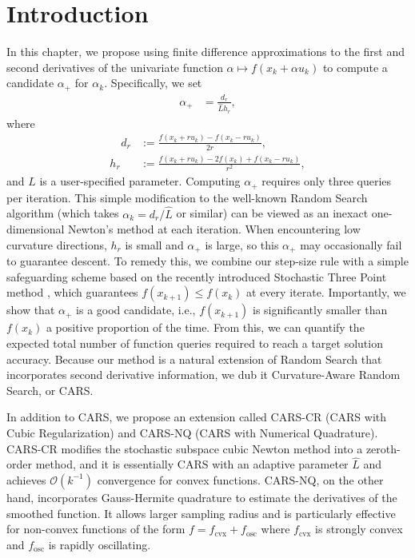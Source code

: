 \section{Introduction}
In this chapter, we propose using finite difference approximations to the first and second derivatives of the univariate function $\alpha \mapsto f(x_k +\alpha u_k)$ to compute a candidate $\alpha_{+}$ for $\alpha_k$. Specifically, we set
\begin{align*}
    \alpha_{+} & = \frac{d_r}{\hat{L}h_r},
\end{align*}
where
\begin{align}
    \quad d_{r} & := \frac{f(x_k+r u_k) - f(x_k-r u_k)}{2r},            \label{eq: FD def d_r}\\
    h_{r}       & := \frac{f(x_k+r u_k) - 2f(x_k) + f(x_k-r u_k)}{r^2}, \label{eq: FD def h_r}
\end{align}
and $\hat{L}$ is a user-specified parameter. Computing $\alpha_+$ requires only three queries per iteration. This simple modification to the well-known Random Search algorithm \cite{ghadimi2013stochastic,nesterov2017random} (which takes $\alpha_k = d_r/\hat{L}$ or similar) can be viewed as an inexact one-dimensional Newton's method at each iteration. When encountering low curvature directions, $h_r$ is small and $\alpha_{+}$ is large, so this $\alpha_{+}$ may occasionally fail to guarantee descent. To remedy this, we combine our step-size rule with a simple safeguarding scheme based on the recently introduced Stochastic Three Point method \cite{bergou2020stochastic}, which guarantees $f(x_{k+1}) \leq f(x_k)$ at every iterate. Importantly, we show that $\alpha_{+}$ is a good candidate, i.e., $f(x_{k+1})$ is significantly smaller than $f(x_k)$ a positive proportion of the time. From this, we can quantify the expected total number of function queries required to reach a target solution accuracy. Because our method is a natural extension of Random Search that incorporates second derivative information, we dub it Curvature-Aware Random Search, or CARS.



In addition to CARS, we propose an extension called CARS-CR (CARS with Cubic Regularization) and CARS-NQ (CARS with Numerical Quadrature). CARS-CR modifies the stochastic subspace cubic Newton method \cite{pmlr-v119-hanzely20a} into a zeroth-order method, and it is essentially CARS with an adaptive parameter $\hat{L}$ and achieves $\mathcal{O}(k^{-1})$ convergence for convex functions. CARS-NQ, on the other hand, incorporates Gauss-Hermite quadrature to estimate the derivatives of the smoothed function. It allows larger sampling radius and is particularly effective for non-convex functions of the form $f = f_{\mathrm{cvx}} + f_{\mathrm{osc}}$ where $f_{\mathrm{cvx}}$ is strongly convex and $f_{\mathrm{osc}}$ is rapidly oscillating.


